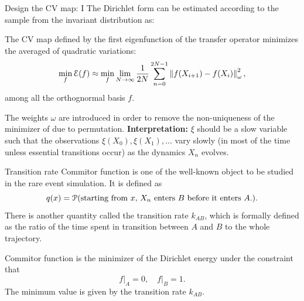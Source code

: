 \documentclass{beamer}
\begin{document}
\begin{frame}{Design the CV map: I}
	The Dirichlet form can be estimated according to the sample from the invariant
	distribution as:
	\begin{theorem}
		The CV map defined by the first eigenfunction of the transfer operator
		minimizes the averaged of quadratic variations:
		\begin{equation*}
			\min_f \mathcal{E}(f) \approx \min_f \lim_{N\rightarrow \infty}\frac{1}{2N}\sum_{n=0}^{2N-1}
			\left\| f(X_{i+1}) - f(X_i) \right\|_{\omega}^2,
		\end{equation*}
		among all the orthognormal basis $f$.
	\end{theorem}
	The weights $\omega$ are introduced in order to remove the non-uniqueness of
	the minimizer of due to permutation. \textbf{Interpretation: } $\xi$ should be a slow variable such that the observations $\xi(X_0), \xi(X_1), ...$
	vary slowly (in most of the time unless essential transitions occur) as the dynamics
	$X_n$ evolves.
\end{frame}

\begin{frame}{Transition rate}
	Commitor function is one of the well-known object to be studied in the rare event
	simulation. It is defined as
	\begin{equation}
		q(x) = \mathcal{P}(\text{starting from $x$, $X_n$ enters $B$ before it enters $A$.}).
	\end{equation}
	There is another quantity called the transition rate $k_{AB}$, which is formally
	defined as the ratio of the time spent in transition between $A$ and $B$ to the
	whole trajectory.
	\begin{theorem}
		Commitor function is the minimizer of the Dirichlet energy under the constraint that
		\begin{equation}
			f\big|_{A} = 0, \quad f\big|_{B} = 1.
		\end{equation}
		The minimum value is given by the transition rate $k_{AB}$.
	\end{theorem}
\end{frame}
\end{document}
